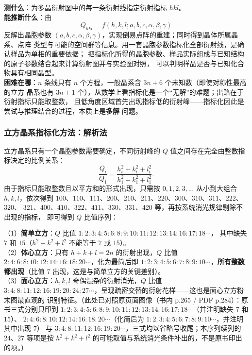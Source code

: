 \begin{probout}
\textbf{测什么}：为多晶衍射图中的每一条衍射线指定衍射指标 $hkl$。\\
\textbf{能推断什么}：由
\begin{equation}
Q_{hkl}=f\left(h,k,l;a,b,c,\alpha,\beta,\gamma\right)
\label{eq:ch04b-indexbase}
\end{equation}
反解出晶胞参数 $(a,b,c,\alpha,\beta,\gamma)$，实现倒易点阵的重建；同时得到晶体所属晶系、点阵
类型与可能的空间群等信息。用一套晶胞参数指标化全部衍射线，是确认样品为单相的重要依据；
把指标化所得的晶胞参数、样品实际组成与已知结构的原子参数结合起来计算衍射图并与实验图对照，
可以判明样品是否与已知化合物具有相同晶型。\\
\textbf{困难在哪}：$n$ 条线只有 $n$ 个方程，一般晶系含 $3n+6$ 个未知数（即使对称性最高的立方
晶系也有 $3n+1$ 个），从数学上看指标化是一个“无解”的难题；出路在于衍射指标只能取整数，
且低角度区域首先出现指标低的衍射峰——指标化因此是尝试与推理结合的过程，本质上是\textbf{多解}
问题。
\end{probout}

\subsubsection{立方晶系指标化方法：解析法}

立方晶系只有一个晶胞参数需要确定，不同衍射峰的 $Q$ 值之间存在完全由整数指标决定的比例关系：
\begin{equation}
\frac{Q_{i}}{Q_{1}}=\frac{h_{i}^{2}+k_{i}^{2}+l_{i}^{2}}{h_{1}^{2}+k_{1}^{2}+l_{1}^{2}} .
\label{eq:ch04b-cubicratio}
\end{equation}
由于指标只能取整数且以平方和的形式出现，只需按 $0,1,2,3,\dots$ 从小到大组合 $h,k,l$，依次得到
$100$、$110$、$111$、$200$、$210$、$211$、$220$、$300$、$310$、$311$、$222$、$320$、
$321$、$400$、$410$、$322$、$411$、$330$、$331$、$420$ 等，再按系统消光规律剔除不出现的指标，
即可得到 $Q$ 比值序列：

（1）\textbf{简单立方}：$Q$ 比值 $1:2:3:4:5:6:8:9:10:11:12:13:14:16:17:18\cdots$，
其中缺失 $7$ 和 $15$（$h^{2}+k^{2}+l^{2}$ 不能等于 $7$ 或 $15$）。\\
（2）\textbf{体心立方}：只有 $h+k+l=2n$ 的衍射出现，$Q$ 比值
$2:4:6:8:10:12:14:16:18:20\cdots$，化为最简后即 $1:2:3:4:5:6:7:8:9:10\cdots$，\textbf{所有整数
都出现}（比值 $7$ 出现，这是与简单立方的关键差别）。\\
（3）\textbf{面心立方}：$h,k,l$ 奇偶混杂的衍射消光，$Q$ 比值
$3:4:8:11:12:16:19:20:24:27\cdots$，呈现疏密交替的衍射花样——这也是面心立方粉末图最直观的
识别特征。（此处已对照原页面图像（书内 p.265 / PDF p.284）：原书三式分别只印到
$1:2:3:4:5:6:8:9:10:11:12:13:14:16:17:18\cdots$（并注明缺失 $7$ 和 $15$）、
$2:4:6:8:10:12:14:16:18:20\cdots$（化简后为 $1:2:3:4:5:6:7:8:9:10\cdots$，并注明其中出现 $7$）
与 $3:4:8:11:12:16:19:20\cdots$，三式均以省略号收尾；本序列续列的 $24$、$27$ 等项是按
$h^{2}+k^{2}+l^{2}$ 的可能取值与系统消光条件补出的，不是原书印出的项。）

